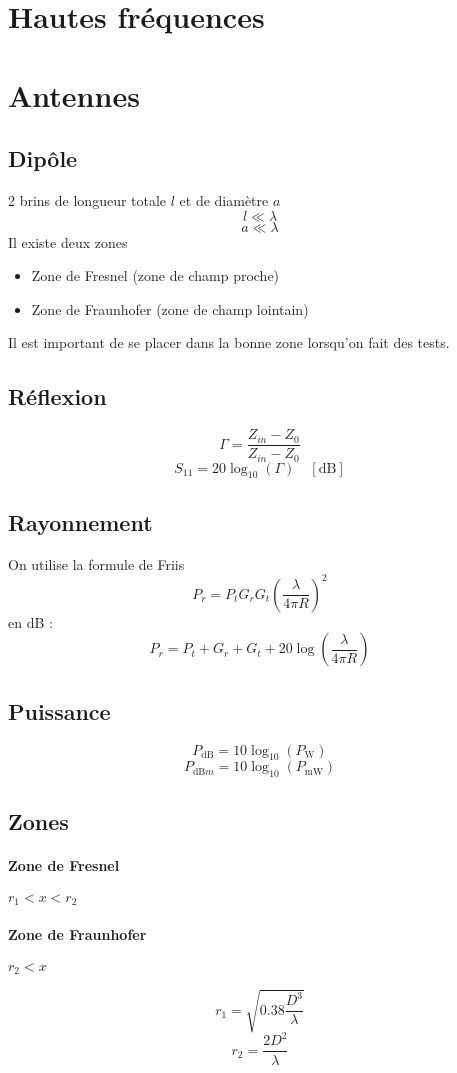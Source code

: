 \documentclass[resume]{subfiles}
\begin{document}
\section{Hautes fréquences}
\section{Antennes}
\subsection{Dipôle}
2 brins de longueur totale $l$ et de diamètre $a$
$$l\ll \lambda$$
$$a\ll\lambda$$
Il existe deux zones
\begin{itemize}
\item Zone de Fresnel (zone de champ proche)
\item Zone de Fraunhofer (zone de champ lointain)
\end{itemize}
Il est important de se placer dans la bonne zone lorsqu'on fait des tests.
\subsection{Réflexion}
$$\Gamma=\frac{Z_{in}-Z_0}{Z_{in}-Z_0}$$
$$S_{11}=20\log_{10}(\Gamma)\quad [\si{\deci\bel}]$$
\subsection{Rayonnement}
On utilise la formule de Friis
$$P_r=P_tG_rG_t\left(\frac{\lambda}{4\pi R}\right)^2$$
en dB :
$$P_r=P_t+G_r+G_t+20\log\left(\frac{\lambda}{4\pi R}\right)$$
\subsection{Puissance}
$$\boxed{P_{\si{\deci\bel}}=10\log_{10}\left(P_{\si{\watt}}\right)}$$
$$\boxed{P_{\si{\deci\bel m}}=10\log_{10}\left(P_{\si{\milli\watt}}\right)}$$
\subsection{Zones}
\paragraph{Zone de Fresnel} $r_1 < x < r_2$
\paragraph{Zone de Fraunhofer} $ r_2 < x$

$$r_1=\sqrt{0.38\frac{D^3}{\lambda}}$$
$$r_2=\frac{2D^2}{\lambda}$$
\end{document}
